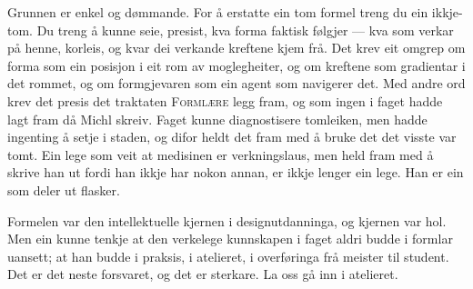Grunnen er enkel og dømmande. For å erstatte ein tom formel treng du ein ikkje-tom. Du treng å kunne seie, presist, kva forma faktisk følgjer — kva som verkar på henne, korleis, og kvar dei verkande kreftene kjem frå. Det krev eit omgrep om forma som ein posisjon i eit rom av moglegheiter, og om kreftene som gradientar i det rommet, og om formgjevaren som ein agent som navigerer det. Med andre ord krev det presis det traktaten \textsc{Formlære} legg fram, og som ingen i faget hadde lagt fram då Michl skreiv. Faget kunne diagnostisere tomleiken, men hadde ingenting å setje i staden, og difor heldt det fram med å bruke det det visste var tomt. Ein lege som veit at medisinen er verkningslaus, men held fram med å skrive han ut fordi han ikkje har nokon annan, er ikkje lenger ein lege. Han er ein som deler ut flasker.

\vignett

Formelen var den intellektuelle kjernen i designutdanninga, og kjernen var hol. Men ein kunne tenkje at den verkelege kunnskapen i faget aldri budde i formlar uansett; at han budde i praksis, i atelieret, i overføringa frå meister til student. Det er det neste forsvaret, og det er sterkare. La oss gå inn i atelieret.
